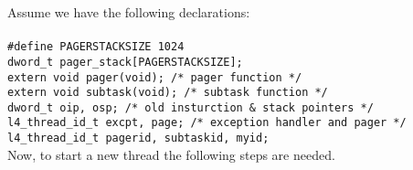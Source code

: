 Assume we have the following declarations: \\ \\
\hspace*{10pt} {\footnotesize\verb+#define PAGERSTACKSIZE 1024+} \\
\hspace*{10pt} {\footnotesize\verb+dword_t pager_stack[PAGERSTACKSIZE];+} \\
\hspace*{10pt} {\footnotesize\verb+extern void pager(void); /* pager function */+} \\
\hspace*{10pt} {\footnotesize\verb+extern void subtask(void); /* subtask function */+} \\
\hspace*{10pt} {\footnotesize\verb+dword_t oip, osp; /* old insturction & stack pointers */+} \\
\hspace*{10pt} {\footnotesize\verb+l4_thread_id_t excpt, page; /* exception handler and pager */+} \\
\hspace*{10pt} {\footnotesize\verb+l4_thread_id_t pagerid, subtaskid, myid;+} \\

Now, to start a new thread the following steps are needed.

